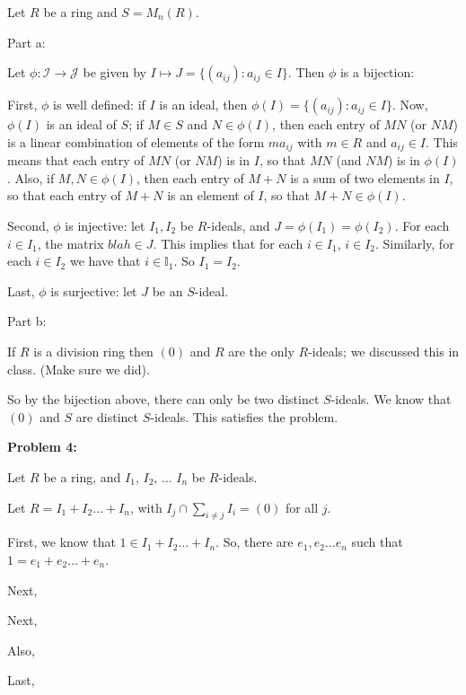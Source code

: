 \documentclass[a4paper,12pt]{article}
\newcommand{\tab}{\hspace{4mm}} %
\newcommand{\shunt}{\vspace{20mm}}
\newcommand{\I}{\mathbb{I}}
\newcommand{\scrI}{\mathcal{I}}
\newcommand{\scrJ}{\mathcal{J}}
\begin{document}
Let $R$ be a ring and $S=M_n(R)$.

Part a:

Let $\phi: \scrI \to \scrJ$ be given by $I \mapsto J=\{(a_{ij}) : a_{ij} \in I\}$. Then $\phi$ is a bijection:

First, $\phi$ is well defined: if $I$ is an ideal, then $\phi(I) = \{(a_{ij}) : a_{ij} \in I\}$. Now, $\phi(I)$ is an ideal of $S$; if $M \in S$ and $N \in \phi(I)$, then each entry of $MN$ (or $NM$) is a linear combination of elements of the form $ma_{ij}$ with $m \in R$ and $a_{ij} \in I$. This means that each entry of $MN$ (or $NM$) is in $I$, so that $MN$ (and $NM$) is in $\phi(I)$. Also, if $M,N \in \phi(I)$, then each entry of $M+N$ is a sum of two elements in $I$, so that each entry of $M+N$ is an element of $I$, so that $M+N \in \phi(I)$.

Second, $\phi$ is injective: let $I_1,I_2$ be $R$-ideals, and $J=\phi(I_1)=\phi(I_2)$. For each $i \in I_1$, the matrix $blah \in J$. This implies that for each $i \in I_1$, $i \in I_2$. Similarly, for each $i \in I_2$ we have that $i \in \I_1$. So $I_1 = I_2$. %

Last, $\phi$ is surjective: let $J$ be an $S$-ideal. %

\shunt

Part b:

If $R$ is a division ring then $(0)$ and $R$ are the only $R$-ideals; we discussed this in class. (Make sure we did).

So by the bijection above, there can only be two distinct $S$-ideals. We know that $(0)$ and $S$ are distinct $S$-ideals. This satisfies the problem.

\shunt

{\bf Problem 4:} %

Let $R$ be a ring, and $I_1$, $I_2$, $\ldots$ $I_n$ be $R$-ideals.

Let $R=I_1 + I_2 \ldots +I_n$, with $I_j \cap \sum\limits_{i \neq j} I_i = (0)$ for all $j$.

\tab First, we know that $1 \in I_1 + I_2 \ldots +I_n$. So, there are $e_1, e_2 \ldots e_n$ such that $1 = e_1 + e_2 \ldots + e_n$.

\tab Next, %

\tab Next, %

\tab Also, %

\tab Last, %
\end{document}
